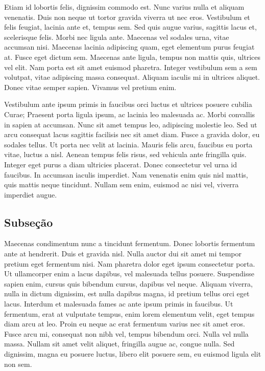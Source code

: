 Etiam id lobortis felis, dignissim commodo est. Nunc varius nulla et aliquam venenatis. Duis non neque ut tortor gravida viverra ut nec eros. Vestibulum et felis feugiat, lacinia ante et, tempus sem. Sed quis augue varius, sagittis lacus et, scelerisque felis. Morbi nec ligula ante. Maecenas vel sodales urna, vitae accumsan nisi. Maecenas lacinia adipiscing quam, eget elementum purus feugiat at. Fusce eget dictum sem. Maecenas ante ligula, tempus non mattis quis, ultrices vel elit. Nam porta est sit amet euismod pharetra. Integer vestibulum sem a sem volutpat, vitae adipiscing massa consequat. Aliquam iaculis mi in ultrices aliquet. Donec vitae semper sapien. Vivamus vel pretium enim\cite{Haykin1998}.

Vestibulum ante ipsum primis in faucibus orci luctus et ultrices posuere cubilia Curae; Praesent porta ligula ipsum, ac lacinia leo malesuada ac. Morbi convallis in sapien at accumsan. Nunc sit amet tempus leo, adipiscing molestie leo. Sed ut arcu consequat lacus sagittis facilisis nec sit amet diam. Fusce a gravida dolor, eu sodales tellus. Ut porta nec velit at lacinia. Mauris felis arcu, faucibus eu porta vitae, luctus a nisl. Aenean tempus felis risus, sed vehicula ante fringilla quis. Integer eget purus a diam ultricies placerat. Donec consectetur vel urna id faucibus. In accumsan iaculis imperdiet. Nam venenatis enim quis nisl mattis, quis mattis neque tincidunt. Nullam sem enim, euismod ac nisi vel, viverra imperdiet augue.

\subsection{Subse\c{c}\~{a}o}
\label{sec:subsec02}

Maecenas condimentum nunc a tincidunt fermentum. Donec lobortis fermentum ante at hendrerit. Duis et gravida nisl. Nulla auctor dui sit amet mi tempor pretium eget fermentum nisi. Nam pharetra dolor eget ipsum consectetur porta. Ut ullamcorper enim a lacus dapibus, vel malesuada tellus posuere. Suspendisse sapien enim, cursus quis bibendum cursus, dapibus vel neque. Aliquam viverra, nulla in dictum dignissim, est nulla dapibus magna, id pretium tellus orci eget lacus. Interdum et malesuada fames ac ante ipsum primis in faucibus. Ut fermentum, erat at vulputate tempus, enim lorem elementum velit, eget tempus diam arcu at leo. Proin eu neque ac erat fermentum varius nec sit amet eros. Fusce arcu mi, consequat non nibh vel, tempus bibendum orci. Nulla vel nulla massa. Nullam sit amet velit aliquet, fringilla augue ac, congue nulla. Sed dignissim, magna eu posuere luctus, libero elit posuere sem, eu euismod ligula elit non sem\cite{Haykin2008}.

